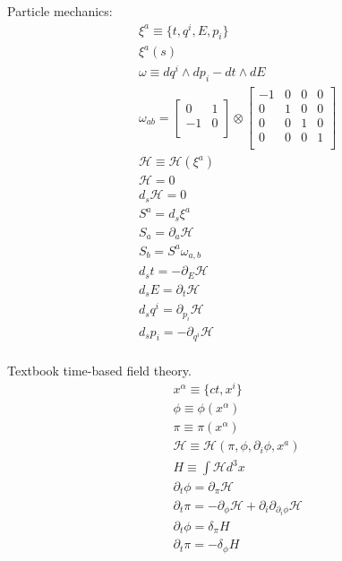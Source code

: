 \documentclass[aps,pra,10pt,twocolumn,floatfix,nofootinbib]{revtex4-1}
\theoremstyle{definition}
\begin{document}
Particle mechanics:
\begin{align*}
&\xi^a\equiv\{t, q^i, E, p_i\} \\
&\xi^a(s)\\
&\omega \equiv  dq^i \wedge dp_i - dt \wedge dE \\
&\omega_{ab} =  \left[
  \begin{array}{cc}
    0 & 1 \\
    -1 & 0 \\
  \end{array}
\right] \otimes \left[
  \begin{array}{cccc}
    -1 & 0 & 0 & 0\\
    0 & 1 & 0 & 0\\
    0 & 0 & 1 & 0 \\
    0 & 0 & 0 & 1 \\
  \end{array}
\right] \\
&\mathcal{H}\equiv\mathcal{H}(\xi^a) \\
&\mathcal{H} = 0 \\
&d_s \mathcal{H} = 0 \\
&S^a=d_s\xi^a \\
&S_a = \partial_a\mathcal{H} \\
&S_b = S^a \omega_{a, b} \\
&d_{s}t = - \partial_{E} \mathcal{H} \\
&d_{s}E = \partial_{t} \mathcal{H} \\
&d_{s}q^i = \partial_{p_i} \mathcal{H} \\
&d_{s}p_i = - \partial_{q^i} \mathcal{H} \\
\end{align*}

Textbook time-based field theory.
\begin{align*}
&x^\alpha\equiv\{ct, x^i\} \\
&\phi\equiv\phi(x^\alpha) \\
&\pi\equiv\pi(x^\alpha) \\
&\mathcal{H}\equiv\mathcal{H}(\pi, \phi, \partial_i\phi, x^a) \\
&H\equiv \int \mathcal{H} d^3x \\
&\partial_{t}\phi = \partial_{\pi} \mathcal{H} \\
&\partial_{t}\pi = - \partial_{\phi} \mathcal{H} + \partial_i \partial_{\partial_i\phi} \mathcal{H} \\
&\partial_{t}\phi = \delta_{\pi} H \\
&\partial_{t}\pi = - \delta_{\phi} H \\
\end{align*}
\end{document}
